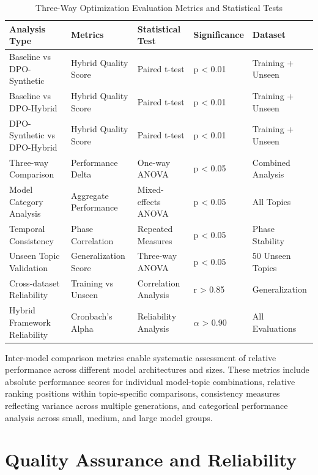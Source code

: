 \begin{table}[htbp]
    \centering
    \caption{Three-Way Optimization Evaluation Metrics and Statistical Tests}
    \label{tab:evaluation-metrics-tests}
    \begin{tabular}{|l|l|l|l|l|}
    \hline
    \textbf{Analysis Type} & \textbf{Metrics} & \textbf{Statistical Test} & \textbf{Significance} & \textbf{Dataset} \\
    \hline
    Baseline vs DPO-Synthetic & Hybrid Quality Score & Paired t-test & p < 0.01 & Training + Unseen \\
    Baseline vs DPO-Hybrid & Hybrid Quality Score & Paired t-test & p < 0.01 & Training + Unseen \\
    DPO-Synthetic vs DPO-Hybrid & Hybrid Quality Score & Paired t-test & p < 0.01 & Training + Unseen \\
    Three-way Comparison & Performance Delta & One-way ANOVA & p < 0.05 & Combined Analysis \\
    Model Category Analysis & Aggregate Performance & Mixed-effects ANOVA & p < 0.05 & All Topics \\
    Temporal Consistency & Phase Correlation & Repeated Measures & p < 0.05 & Phase Stability \\
    Unseen Topic Validation & Generalization Score & Three-way ANOVA & p < 0.05 & 50 Unseen Topics \\
    Cross-dataset Reliability & Training vs Unseen & Correlation Analysis & r > 0.85 & Generalization \\
    Hybrid Framework Reliability & Cronbach's Alpha & Reliability Analysis & \(\alpha\) > 0.90 & All Evaluations \\
    \hline
    \end{tabular}
\end{table}

Inter-model comparison metrics enable systematic assessment of relative performance across different model architectures and sizes. These metrics include absolute performance scores for individual model-topic combinations, relative ranking positions within topic-specific comparisons, consistency measures reflecting variance across multiple generations, and categorical performance analysis across small, medium, and large model groups.

\section{Quality Assurance and Reliability}
\label{sec:quality-assurance}

